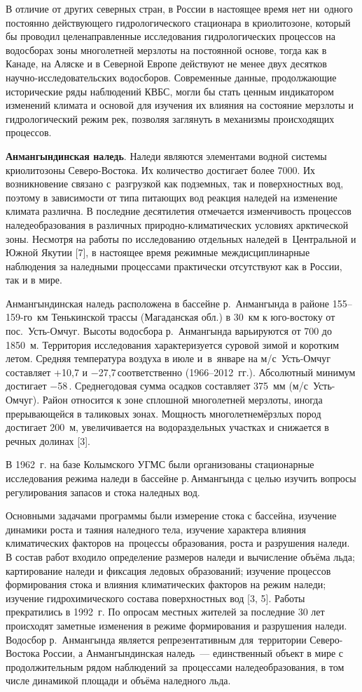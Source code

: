 В отличие от других северных стран, в России в настоящее время нет ни~одного постоянно действующего гидрологического стационара в криолитозоне, который бы проводил целенаправленные исследования гидрологических процессов на водосборах зоны многолетней мерзлоты на постоянной основе, тогда как в Канаде, на Аляске и в Северной Европе действуют не менее двух десятков научно-исследовательских водосборов. Современные данные, продолжающие исторические ряды наблюдений КВБС, могли бы стать ценным индикатором изменений климата и основой для изучения их влияния на состояние мерзлоты и гидрологический режим рек, позволяя заглянуть в механизмы происходящих процессов.

\textbf{Анмангындинская наледь}. Наледи являются элементами водной системы криолитозоны Северо-Востока. Их количество достигает более 7000. Их возникновение связано с~разгрузкой как подземных, так и поверхностных вод, поэтому в зависимости от типа питающих вод реакция наледей на изменение климата различна. В последние десятилетия отмечается изменчивость процессов наледеобразования в различных природно-климатических условиях арктической зоны. Несмотря на работы по исследованию отдельных наледей в~Центральной и Южной Якутии [7], в настоящее время режимные междисциплинарные наблюдения за наледными процессами практически отсутствуют как в России, так и в мире.


Анмангындинская наледь расположена в бассейне р.~Анмангында в районе 155--159-го~км Тенькинской трассы (Магаданская обл.) в 30~км к юго-востоку от пос.~Усть-Омчуг. Высоты водосбора р.~Анмангында варьируются от 700 до 1850~м. Территория исследования характеризуется суровой зимой и коротким летом. Средняя температура воздуха в июле и~в~январе на м/с~Усть-Омчуг составляет +10,7 и $-$27,7\,\dgc соответственно (1966--2012~гг.). Абсолютный минимум достигает $-$58\,. Среднегодовая сумма осадков составляет 375~мм (м/с~Усть-Омчуг). Район относится к зоне сплошной многолетней мерзлоты, иногда прерывающейся в таликовых зонах. Мощность многолетнемёрзлых пород достигает 200~м, увеличивается на водораздельных участках и снижается в речных долинах [3].

В 1962~г. на базе Колымского УГМС были организованы стационарные исследования режима наледи в бассейне р.\,Анмангында с целью изучить вопросы регулирования запасов и стока наледных вод.

Основными задачами программы были измерение стока с бассейна, изучение динамики роста и таяния наледного тела, изучение характера влияния климатических факторов на~процессы образования, роста и разрушения наледи. В состав работ входило определение размеров наледи и вычисление объёма льда; картирование наледи и фиксация ледовых образований; изучение процессов формирования стока и влияния климатических факторов на режим наледи; изучение гидрохимического состава поверхностных вод [3, 5].
\clearpage
Работы прекратились в 1992~г. По опросам местных жителей за последние 30 лет происходят заметные изменения в режиме формирования и разрушения наледи. Водосбор р.~Анмангында является репрезентативным для~территории Северо-Востока России, а Анмангындинская наледь~--- единственный объект в мире с продолжительным рядом наблюдений за~процессами наледеобразования, в том числе динамикой площади и объёма наледного льда.

